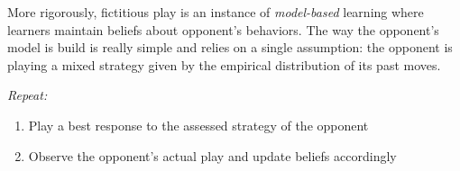 More rigorously, fictitious play is an instance of \textit{model-based}
learning where learners maintain beliefs about opponent's behaviors. The
way the opponent's model is build is really simple and relies on a single
assumption: the opponent is playing a mixed strategy given by the empirical
distribution of its past moves.

\begin{procedure}
    \emph{Repeat:}
    \begin{enumerate}
	    \item Play a best response to the assessed strategy of the opponent
	    \item Observe the opponent's actual play and update beliefs accordingly
    \end{enumerate}
    \label{chap9:fictplayproc}
\end{procedure}

